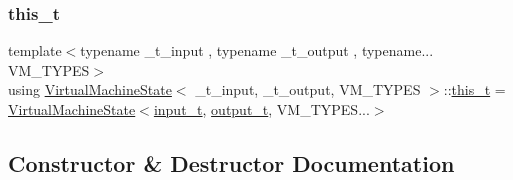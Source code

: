\mbox{\label{class_virtual_machine_state_ada0e1bebef2d73581c6adcd55f8be521}} 
\subsubsection{\texorpdfstring{this\+\_\+t}{this\_t}}
{\footnotesize\ttfamily template$<$typename \+\_\+t\+\_\+input , typename \+\_\+t\+\_\+output , typename... V\+M\+\_\+\+T\+Y\+P\+ES$>$ \\
using \hyperlink{class_virtual_machine_state}{Virtual\+Machine\+State}$<$ \+\_\+t\+\_\+input, \+\_\+t\+\_\+output, V\+M\+\_\+\+T\+Y\+P\+ES $>$\+::\hyperlink{class_virtual_machine_state_ada0e1bebef2d73581c6adcd55f8be521}{this\+\_\+t} =  \hyperlink{class_virtual_machine_state}{Virtual\+Machine\+State}$<$\hyperlink{class_virtual_machine_state_aeb5e01ec57466fd3734e0c29f2b8da0a}{input\+\_\+t}, \hyperlink{class_virtual_machine_state_a1015cee5061f82f82ef6a953b51f9bd5}{output\+\_\+t}, V\+M\+\_\+\+T\+Y\+P\+E\+S...$>$}



\subsection{Constructor \& Destructor Documentation}
\mbox{\label{class_virtual_machine_state_a9760db87745be704f046f08369ca5eb2}} 
